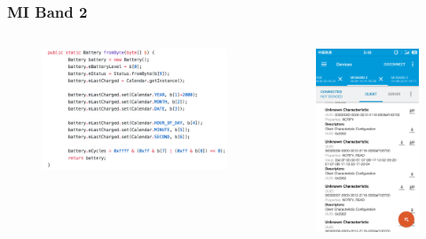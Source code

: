 \documentclass[UTF8]{ctexbeamer}
\begin{document}
\begin{frame}
  \frametitle{MI Band 2}
  \begin{columns}
  \begin{figure}
    \includegraphics[width=0.9\linewidth]{java.png}
  \end{figure}
  \begin{figure}
    \includegraphics[width=0.6\linewidth]{battery.png}
  \end{figure}
  \end{columns}
\end{frame}
\end{document}
